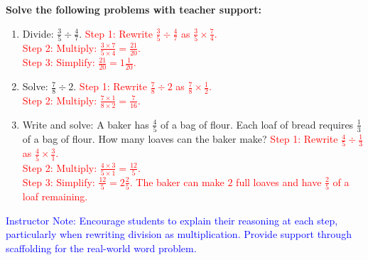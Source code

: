 \documentclass[12pt]{article}
\begin{document}
\begin{tcolorbox}[colframe=black!60, colback=white, 
coltitle=black, colbacktitle=black!15, fonttitle=\bfseries\Large, 
title=Guided Practice, halign title=center, left=10pt, right=10pt, top=10pt, bottom=15pt]
\textbf{Solve the following problems with teacher support:}
\begin{enumerate}[itemsep=3em]
    \item Divide: \( \frac{3}{5} \div \frac{4}{7} \).
    \textcolor{red}{
    Step 1: Rewrite \( \frac{3}{5} \div \frac{4}{7} \) as \( \frac{3}{5} \times \frac{7}{4} \).\\
    Step 2: Multiply: \( \frac{3 \times 7}{5 \times 4} = \frac{21}{20} \).\\
    Step 3: Simplify: \( \frac{21}{20} = 1 \frac{1}{20} \).}

    \item Solve: \( \frac{7}{8} \div 2 \).
    \textcolor{red}{
    Step 1: Rewrite \( \frac{7}{8} \div 2 \) as \( \frac{7}{8} \times \frac{1}{2} \).\\
    Step 2: Multiply: \( \frac{7 \times 1}{8 \times 2} = \frac{7}{16} \).}

    \item Write and solve: A baker has \( \frac{4}{5} \) of a bag of flour. Each loaf of bread requires \( \frac{1}{3} \) of a bag of flour. How many loaves can the baker make?
    \textcolor{red}{
    Step 1: Rewrite \( \frac{4}{5} \div \frac{1}{3} \) as \( \frac{4}{5} \times \frac{3}{1} \).\\
    Step 2: Multiply: \( \frac{4 \times 3}{5 \times 1} = \frac{12}{5} \).\\
    Step 3: Simplify: \( \frac{12}{5} = 2 \frac{2}{5} \). The baker can make \( 2 \) full loaves and have \( \frac{2}{5} \) of a loaf remaining.}
\end{enumerate}
\textcolor{blue}{Instructor Note: Encourage students to explain their reasoning at each step, particularly when rewriting division as multiplication. Provide support through scaffolding for the real-world word problem.}
\end{tcolorbox}

\vspace{1em}
\end{document}
